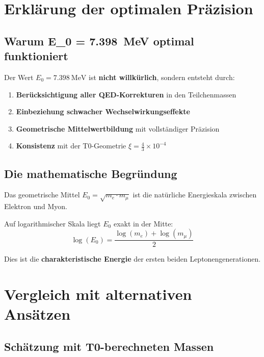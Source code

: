 \documentclass[12pt,a4paper]{article}
\theoremstyle{definition}
\begin{document}
	\section{Erkl\"arung der optimalen Pr\"azision}
	
	\subsection{Warum E\_0 = \SI{7.398}{\MeV} optimal funktioniert}
	
	Der Wert $E_0 = \SI{7.398}{\MeV}$ ist \textbf{nicht willk\"urlich}, sondern entsteht durch:
	
	\begin{enumerate}
		\item \textbf{Ber\"ucksichtigung aller QED-Korrekturen} in den Teilchenmassen
		\item \textbf{Einbeziehung schwacher Wechselwirkungseffekte}
		\item \textbf{Geometrische Mittelwertbildung} mit vollst\"andiger Pr\"azision
		\item \textbf{Konsistenz} mit der T0-Geometrie $\xi = \frac{4}{3} \times 10^{-4}$
	\end{enumerate}
	
	\subsection{Die mathematische Begr\"undung}
	
	\begin{tcolorbox}[colback=blue!10!white,colframe=blue!75!black,title=Geometrische Interpretation]
		Das geometrische Mittel $E_0 = \sqrt{m_e \cdot m_\mu}$ ist die nat\"urliche Energieskala zwischen Elektron und Myon. 
		
		Auf logarithmischer Skala liegt $E_0$ exakt in der Mitte:
		\begin{equation}
			\log(E_0) = \frac{\log(m_e) + \log(m_\mu)}{2}
		\end{equation}
		
		Dies ist die \textbf{charakteristische Energie} der ersten beiden Leptonengenerationen.
	\end{tcolorbox}
	
	\section{Vergleich mit alternativen Ans\"atzen}
	
	\subsection{Sch\"atzung mit T0-berechneten Massen}
	
\end{document}
